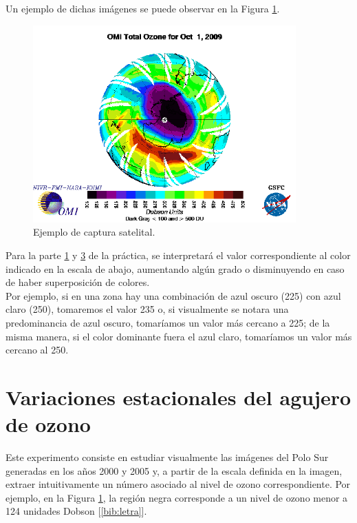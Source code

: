 \documentclass[a4paper]{article}
\begin{document}
Un ejemplo de dichas imágenes se puede observar en la Figura \ref{fig:sample}.

\begin{figure}[ht]
\centering
\includegraphics[width=0.9\textwidth]{assets/sample.png}
\caption{\label{fig:sample}Ejemplo de captura satelital.}
\end{figure}

Para la parte \hyperref[section:parte1]{1} y \hyperref[section:parte3]{3} de la práctica, se interpretará el valor correspondiente al color indicado en la escala de abajo, aumentando algún grado o disminuyendo en caso de haber superposición de colores.\\
Por ejemplo, si en una zona hay una combinación de azul oscuro (225) con azul claro (250), tomaremos el valor 235 o, si visualmente se notara una predominancia de azul oscuro, tomaríamos un valor más cercano a 225; de la misma manera, si el color dominante fuera el azul claro, tomaríamos un valor más cercano al 250.

\newpage
\section{Variaciones estacionales del agujero de ozono}
\label{section:parte1}

Este experimento consiste en estudiar visualmente las imágenes del Polo Sur generadas en los años 2000 y 2005 y, a partir de la escala definida en la imagen, extraer intuitivamente un número asociado al nivel de ozono correspondiente. Por ejemplo, en la Figura \ref{fig:sample}, la región negra corresponde a un nivel de ozono menor a 124 unidades Dobson [\ref{bib:letra}]. 
\end{document}
